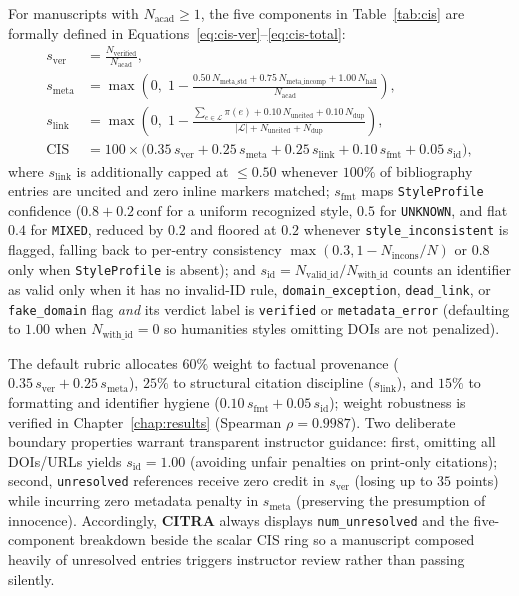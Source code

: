 For manuscripts with $N_{\text{acad}} \ge 1$, the five components in Table~\ref{tab:cis} are formally defined in Equations~\eqref{eq:cis-ver}--\eqref{eq:cis-total}:
\begin{align}
s_{\text{ver}} &= \frac{N_{\text{verified}}}{N_{\text{acad}}}, \label{eq:cis-ver}\\
s_{\text{meta}} &= \max\!\left(0,\; 1 - \frac{0.50\,N_{\text{meta\_std}} + 0.75\,N_{\text{meta\_incomp}} + 1.00\,N_{\text{hall}}}{N_{\text{acad}}}\right), \label{eq:cis-meta}\\
s_{\text{link}} &= \max\!\left(0,\; 1 - \frac{\sum_{e \in \mathcal{L}} \pi(e) + 0.10\,N_{\text{uncited}} + 0.10\,N_{\text{dup}}}{|\mathcal{L}| + N_{\text{uncited}} + N_{\text{dup}}}\right), \label{eq:cis-link}\\
\text{CIS} &= 100 \times \bigl(0.35\,s_{\text{ver}} + 0.25\,s_{\text{meta}} + 0.25\,s_{\text{link}} + 0.10\,s_{\text{fmt}} + 0.05\,s_{\text{id}}\bigr), \label{eq:cis-total}
\end{align}
where $s_{\text{link}}$ is additionally capped at $\le 0.50$ whenever $100\%$ of bibliography entries are uncited and zero inline markers matched; $s_{\text{fmt}}$ maps \texttt{StyleProfile} confidence ($0.8 + 0.2\,\text{conf}$ for a uniform recognized style, $0.5$ for \texttt{UNKNOWN}, and flat $0.4$ for \texttt{MIXED}, reduced by $0.2$ and floored at $0.2$ whenever \texttt{style\_inconsistent} is flagged, falling back to per-entry consistency $\max(0.3, 1 - N_{\text{incons}} / N)$ or $0.8$ only when \texttt{StyleProfile} is absent); and $s_{\text{id}} = N_{\text{valid\_id}} / N_{\text{with\_id}}$ counts an identifier as valid only when it has no invalid-ID rule, \texttt{domain\_exception}, \texttt{dead\_link}, or \texttt{fake\_domain} flag \emph{and} its verdict label is \texttt{verified} or \texttt{metadata\_error} (defaulting to $1.00$ when $N_{\text{with\_id}} = 0$ so humanities styles omitting DOIs are not penalized).

The default rubric allocates $60\%$ weight to factual provenance ($0.35\,s_{\text{ver}} + 0.25\,s_{\text{meta}}$), $25\%$ to structural citation discipline ($s_{\text{link}}$), and $15\%$ to formatting and identifier hygiene ($0.10\,s_{\text{fmt}} + 0.05\,s_{\text{id}}$); weight robustness is verified in Chapter~\ref{chap:results} (Spearman $\rho = 0.9987$). Two deliberate boundary properties warrant transparent instructor guidance: first, omitting all DOIs/URLs yields $s_{\text{id}} = 1.00$ (avoiding unfair penalties on print-only citations); second, \texttt{unresolved} references receive zero credit in $s_{\text{ver}}$ (losing up to $35$ points) while incurring zero metadata penalty in $s_{\text{meta}}$ (preserving the presumption of innocence). Accordingly, \textbf{CITRA} always displays \texttt{num\_unresolved} and the five-component breakdown beside the scalar CIS ring so a manuscript composed heavily of unresolved entries triggers instructor review rather than passing silently.

